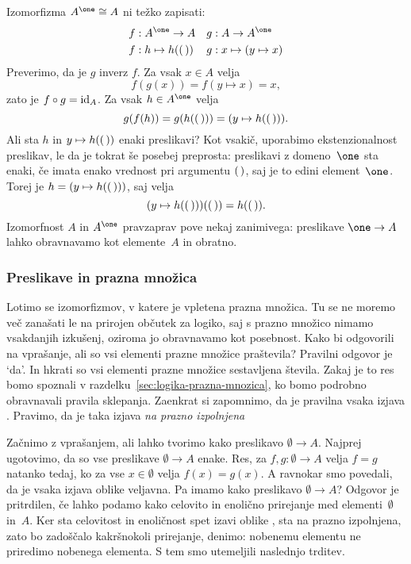 Izomorfizma $A^\one \cong A$ ni težko zapisati:
%
\begin{align*}
  f &: A^\one \to A &
  g &: A \to A^\one \\
  f &: h \mapsto h(\unit) &
  g &: x \mapsto (y \mapsto x)
\end{align*}
%
Preverimo, da je $g$ inverz $f$. Za vsak $x \in A$ velja
%
\begin{equation*}
  f(g(x)) = f(y \mapsto x) = x,
\end{equation*}
%
zato je $f \circ g = \id[A]$. Za vsak $h \in A^\one$ velja
%
\begin{equation*}
  g(f(h)) = g(h(\unit)) = (y \mapsto h(\unit)).
\end{equation*}
%
Ali sta $h$ in $y \mapsto h(\unit)$ enaki preslikavi? Kot vsakič, uporabimo
ekstenzionalnost preslikav, le da je tokrat še posebej preprosta: preslikavi z
domeno~$\one$ sta enaki, če imata enako vrednost pri argumentu $\unit$, saj je to edini
element~$\one$. Torej je $h = (y \mapsto h(\unit))$, saj velja
%
\begin{equation*}
  (y \mapsto h(\unit))(\unit) = h(\unit).
\end{equation*}
%
Izomorfnost $A$ in $A^\one$ pravzaprav pove nekaj zanimivega: preslikave $\one \to A$
lahko obravnavamo kot elemente~$A$ in obratno.


\subsubsection{Preslikave in prazna množica}
\label{sec:presl-prazna-mnozica}

Lotimo se izomorfizmov, v katere je vpletena prazna množica. Tu se ne moremo več zanašati
le na prirojen občutek za logiko, saj s prazno množico nimamo vsakdanjih izkušenj, oziroma
jo obravnavamo kot posebnost. Kako bi odgovorili na vprašanje, ali so vsi elementi prazne
množice praštevila? Pravilni odgovor je `da'. In hkrati so vsi elementi prazne množice
sestavljena števila. Zakaj je to res bomo spoznali v
razdelku~\ref{sec:logika-prazna-mnozica}, ko bomo podrobno obravnavali pravila sklepanja.
Zaenkrat si zapomnimo, da je pravilna vsaka izjava . Pravimo, da je taka izjava \emph{na prazno izpolnjena}

Začnimo z vprašanjem, ali lahko tvorimo kako preslikavo $\emptyset \to A$. Najprej
ugotovimo, da so vse preslikave $\emptyset \to A$ enake. Res, za $f, g : \emptyset \to A$
velja $f = g$ natanko tedaj, ko za vse $x \in \emptyset$ velja $f(x) = g(x)$. A ravnokar
smo povedali, da je vsaka izjava oblike  veljavna. Pa
imamo kako preslikavo $\emptyset \to A$? Odgovor je pritrdilen, če lahko podamo kako
celovito in enolično prirejanje med elementi~$\emptyset$ in~$A$. Ker sta celovitost in
enoličnost spet izavi oblike , sta na prazno izpolnjena,
zato bo zadoščalo kakršnokoli prirejanje, denimo: nobenemu elementu ne priredimo nobenega
elementa. S tem smo utemeljili naslednjo trditev.

